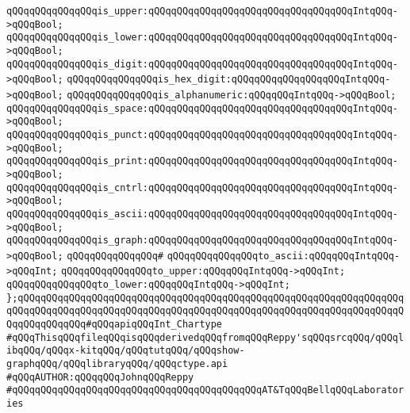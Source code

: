 \verb|qQQqqQQqqQQqqQQqis_upper:qQQqqQQqqQQqqQQqqQQqqQQqqQQqqQQqqQQqIntqQQq->qQQqBool;|\newline
\verb|qQQqqQQqqQQqqQQqis_lower:qQQqqQQqqQQqqQQqqQQqqQQqqQQqqQQqqQQqIntqQQq->qQQqBool;|\newline
\verb|qQQqqQQqqQQqqQQqis_digit:qQQqqQQqqQQqqQQqqQQqqQQqqQQqqQQqqQQqIntqQQq->qQQqBool;|\newline
\verb|qQQqqQQqqQQqqQQqis_hex_digit:qQQqqQQqqQQqqQQqqQQqIntqQQq->qQQqBool;|\newline
\verb|qQQqqQQqqQQqqQQqis_alphanumeric:qQQqqQQqIntqQQq->qQQqBool;|\newline
\verb|qQQqqQQqqQQqqQQqis_space:qQQqqQQqqQQqqQQqqQQqqQQqqQQqqQQqqQQqIntqQQq->qQQqBool;|\newline
\verb|qQQqqQQqqQQqqQQqis_punct:qQQqqQQqqQQqqQQqqQQqqQQqqQQqqQQqqQQqIntqQQq->qQQqBool;|\newline
\verb|qQQqqQQqqQQqqQQqis_print:qQQqqQQqqQQqqQQqqQQqqQQqqQQqqQQqqQQqIntqQQq->qQQqBool;|\newline
\verb|qQQqqQQqqQQqqQQqis_cntrl:qQQqqQQqqQQqqQQqqQQqqQQqqQQqqQQqqQQqIntqQQq->qQQqBool;|\newline
\verb|qQQqqQQqqQQqqQQqis_ascii:qQQqqQQqqQQqqQQqqQQqqQQqqQQqqQQqqQQqIntqQQq->qQQqBool;|\newline
\verb|qQQqqQQqqQQqqQQqis_graph:qQQqqQQqqQQqqQQqqQQqqQQqqQQqqQQqqQQqIntqQQq->qQQqBool;|\newline
\newline
\verb|qQQqqQQqqQQqqQQq#|\newline
\verb|qQQqqQQqqQQqqQQqto_ascii:qQQqqQQqIntqQQq->qQQqInt;|\newline
\verb|qQQqqQQqqQQqqQQqto_upper:qQQqqQQqIntqQQq->qQQqInt;|\newline
\verb|qQQqqQQqqQQqqQQqto_lower:qQQqqQQqIntqQQq->qQQqInt;|\newline
\newline
\verb|};qQQqqQQqqQQqqQQqqQQqqQQqqQQqqQQqqQQqqQQqqQQqqQQqqQQqqQQqqQQqqQQqqQQqqQQqqQQqqQQqqQQqqQQqqQQqqQQqqQQqqQQqqQQqqQQqqQQqqQQqqQQqqQQqqQQqqQQqqQQqqQQqqQQqqQQq#qQQqapiqQQqInt_Chartype|\newline
\newline
\verb|#qQQqThisqQQqfileqQQqisqQQqderivedqQQqfromqQQqReppy'sqQQqsrcqQQq/qQQqlibqQQq/qQQqx-kitqQQq/qQQqtutqQQq/qQQqshow-graphqQQq/qQQqlibraryqQQq/qQQqctype.api|\newline
\newline
\verb|#qQQqAUTHOR:qQQqqQQqJohnqQQqReppy|\newline
\verb|#qQQqqQQqqQQqqQQqqQQqqQQqqQQqqQQqqQQqqQQqqQQqAT&TqQQqBellqQQqLaboratories|\newline
